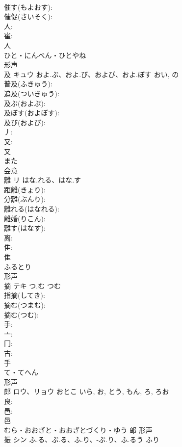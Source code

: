 \documentclass[8pt]{extreport}
\begin{document}
\begin{CJK}{UTF8}{min}
\\	催す(もよおす): 
\\	催促(さいそく): 
\\	人: 
\\	崔: 
\\	人	
\\	ひと・にんべん・ひとやね	
\\	形声 
\\	及	キュウ	およ.ぶ、およ.び、および、およ.ぼす	おい, の	
\\	普及(ふきゅう): 
\\	追及(ついきゅう): 
\\	及ぶ(およぶ): 
\\	及ぼす(およぼす): 
\\	及び(および): 
\\	丿: 
\\	又: 
\\	又	
\\	また	
\\	会意 
\\	離	リ	はな.れる、はな.す		
\\	距離(きょり): 
\\	分離(ぶんり): 
\\	離れる(はなれる): 
\\	離婚(りこん): 
\\	離す(はなす): 
\\	离: 
\\	隹: 
\\	隹	
\\	ふるとり	
\\	形声 
\\	摘	テキ	つ.む	つむ	
\\	指摘(してき): 
\\	摘む(つまむ): 
\\	摘む(つむ): 
\\	手: 
\\	亠: 
\\	冂: 
\\	古: 
\\	手	
\\	て・てへん	
\\	形声 
\\	郎	ロウ、リョウ	おとこ	いら, お, とう, もん, ろ, ろお	
\\	良: 
\\	邑: 
\\	邑	
\\	むら・おおざと・おおざとづくり・ゆう	郞	形声 
\\	振	シン	ふ.る、ぶ.る、ふ.り、-ぶ.り、ふ.るう	ふり	

\end{CJK}
\end{document}
